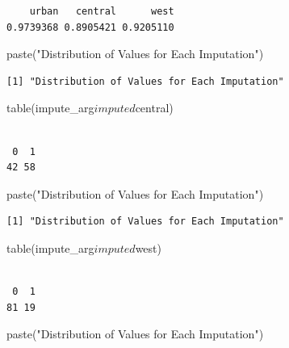 \documentclass[]{article}
\newenvironment{Shaded}{}{}
\newcommand{\KeywordTok}[1]{\textcolor[rgb]{0.00,0.00,1.00}{#1}}
\newcommand{\NormalTok}[1]{#1}
\newcommand{\OperatorTok}[1]{#1}
\newcommand{\StringTok}[1]{\textcolor[rgb]{0.00,0.50,0.50}{#1}}
\begin{document}
\begin{verbatim}
    urban   central      west 
0.9739368 0.8905421 0.9205110 
\end{verbatim}

\begin{Shaded}
\begin{Highlighting}[]
\KeywordTok{paste}\NormalTok{(}\StringTok{"Distribution of Values for Each Imputation"}\NormalTok{)}
\end{Highlighting}
\end{Shaded}

\begin{verbatim}
[1] "Distribution of Values for Each Imputation"
\end{verbatim}

\begin{Shaded}
\begin{Highlighting}[]
\KeywordTok{table}\NormalTok{(impute_arg}\OperatorTok{$}\NormalTok{imputed}\OperatorTok{$}\NormalTok{central)}
\end{Highlighting}
\end{Shaded}

\begin{verbatim}

 0  1 
42 58 
\end{verbatim}

\begin{Shaded}
\begin{Highlighting}[]
\KeywordTok{paste}\NormalTok{(}\StringTok{"Distribution of Values for Each Imputation"}\NormalTok{)}
\end{Highlighting}
\end{Shaded}

\begin{verbatim}
[1] "Distribution of Values for Each Imputation"
\end{verbatim}

\begin{Shaded}
\begin{Highlighting}[]
\KeywordTok{table}\NormalTok{(impute_arg}\OperatorTok{$}\NormalTok{imputed}\OperatorTok{$}\NormalTok{west)}
\end{Highlighting}
\end{Shaded}

\begin{verbatim}

 0  1 
81 19 
\end{verbatim}

\begin{Shaded}
\begin{Highlighting}[]
\KeywordTok{paste}\NormalTok{(}\StringTok{"Distribution of Values for Each Imputation"}\NormalTok{)}
\end{Highlighting}
\end{Shaded}
\end{document}

